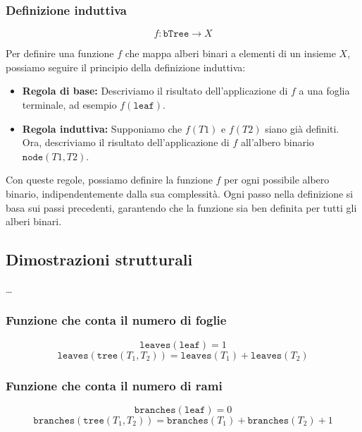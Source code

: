 \subsubsection{Definizione induttiva}
\[
f: \texttt{bTree} \rightarrow X  
\]

Per definire una funzione $f$ che mappa alberi binari a elementi di un insieme $X$, possiamo seguire il principio della definizione induttiva:

\begin{itemize}
  \item \textbf{Regola di base:} Descriviamo il risultato dell'applicazione di $f$ a una foglia terminale, ad esempio $f(\texttt{leaf})$.

  \item \textbf{Regola induttiva:} Supponiamo che $f(T1)$ e $f(T2)$ siano già definiti. Ora, descriviamo il risultato dell'applicazione di
  $f$ all'albero binario $\texttt{node}(T1, T2)$.
\end{itemize}

Con queste regole, possiamo definire la funzione $f$ per ogni possibile albero binario, indipendentemente dalla sua complessità. Ogni passo nella definizione
si basa sui passi precedenti, garantendo che la funzione sia ben definita per tutti gli alberi binari.

\subsection{Dimostrazioni strutturali}
\dots
\subsubsection{Funzione che conta il numero di foglie}
\[
\texttt{leaves}(\texttt{leaf}) = 1
\]
\[
\texttt{leaves}(\texttt{tree}(T_1, T_2)) = \texttt{leaves}(T_1) + \texttt{leaves}(T_2)
\]
\subsubsection{Funzione che conta il numero di rami}
\[
\texttt{branches}(\texttt{leaf}) = 0
\]
\[
\texttt{branches}(\texttt{tree}(T_1, T_2)) = \texttt{branches}(T_1) + \texttt{branches}(T_2) + 1
\]